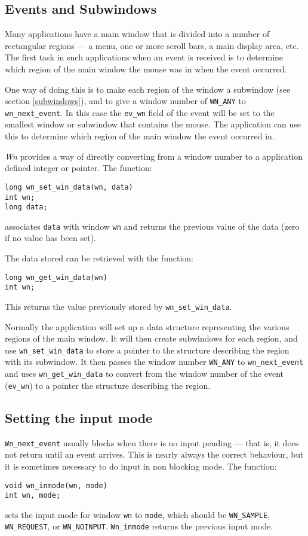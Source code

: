 \subsection{Events and Subwindows}
\label{events_and_subwindows}
Many applications have a main window that is divided into a number of
rectangular regions --- a menu, one or more scroll bars, a main display
area, etc.
The first task in such applications when an event is received is to
determine which region of the main window the mouse was in when the
event occurred.

One way of doing this is to make each region of the window a
subwindow (see section \ref{subwindows}), and to give a window
number of {\tt WN\_ANY} to {\tt wn\_next\_event}.
In this case the {\tt ev\_wn} field of the event will be set to the
smallest window or subwindow that contains the mouse.
The application can use this to determine which region of the main
window the event occurred in.

{\em Wn} provides a way of directly converting from a window number
to a application defined integer or pointer.
The function:
\begin{verbatim}
long wn_set_win_data(wn, data)
int wn;
long data;
\end{verbatim}
associates {\tt data} with window {\tt wn} and returns the previous
value of the data (zero if no value has been set).

The data stored can be retrieved with the function:
\begin{verbatim}
long wn_get_win_data(wn)
int wn;
\end{verbatim}
This returns the value previously stored by {\tt wn\_set\_win\_data}.

Normally the application will set up a data structure representing
the various regions of the main window.
It will then create subwindows for each region, and use {\tt wn\_set\_win\_data}
to store a pointer to the structure describing the region with its
subwindow.
It then passes the window number {\tt WN\_ANY} to {\tt wn\_next\_event}
and uses {\tt wn\_get\_win\_data} to convert from the window number
of the event ({\tt ev\_wn}) to a pointer the structure describing the region.
\subsection{Setting the input mode}
{\tt Wn\_next\_event} usually blocks when there is no input pending ---
that is, it does not return until an event arrives.
This is nearly always the correct behaviour, but it is sometimes
necessary to do input in non blocking mode. The function:
\begin{verbatim}
void wn_inmode(wn, mode)
int wn, mode;
\end{verbatim}
sets the input mode for window {\tt wn} to {\tt mode}, which should be
{\tt WN\_SAMPLE}, {\tt WN\_REQUEST}, or {\tt WN\_NOINPUT}.
{\tt Wn\_inmode} returns the previous input mode.

